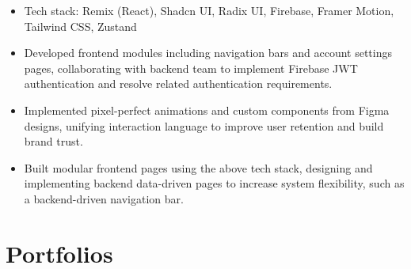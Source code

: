 \documentclass{resume}
\newcommand{\en}[1]{#1}
\newcommand{\zh}[1]{}
\begin{document}
\en{}
\zh{\datedsubsection{\textbf{\href{https://www.trychad.com/}{Chad}}}{}}
\en{}
\zh{\role{前端工程师}{}}
\begin{itemize}
    \item \en{Tech stack: Remix (React), Shadcn UI, Radix UI, Firebase, Framer Motion, Tailwind CSS, Zustand}
          \zh{技术栈：Remix（React）、Shadcn UI、Radix UI、Firebase、Framer Motion、Tailwind CSS、Zustand}
    \item \en{Developed frontend modules including navigation bars and account settings pages, collaborating with backend team to implement Firebase JWT authentication and resolve related authentication requirements.}
          \zh{负责前端模块开发，包括导航栏、账户设置页等，配合后端通过JWT解决 Firebase 认证问题等需求。}
    \item \en{Implemented pixel-perfect animations and custom components from Figma designs, unifying interaction language to improve user retention and build brand trust.}
          \zh{实现Figma中 1:1 动画效果和自定义组件，统一交互语言，提升用户留存率，构建品牌信任。}
    \item \en{Built modular frontend pages using the above tech stack, designing and implementing backend data-driven pages to increase system flexibility, such as a backend-driven navigation bar.}
          \zh{使用上述技术栈构建前端页面，模块化设计，设计并实现后端数据驱动的页面，提高系统灵活度。如后端数据驱动导航栏。}
\end{itemize}

\section{\en{Portfolios}\zh{个人项目}}
\end{document}
